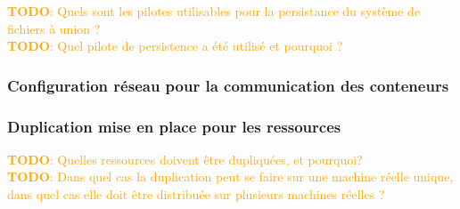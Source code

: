 \documentclass[a11paper, 11pt]{article}
\newcommand{\todo}[1]{\textcolor{orange}{\textbf{TODO}: #1}}
\begin{document}
\todo{Quels sont les pilotes utilisables pour la persistance du système de fichiers
à union ?} \\
\todo{Quel pilote de persistence a été utilisé et pourquoi ?}

\subsubsection{Configuration réseau pour la communication des conteneurs}

\subsubsection{Duplication mise en place pour les ressources}

\todo{Quelles ressources doivent être dupliquées, et pourquoi?} \\
\todo{Dans quel cas la duplication peut se faire sur une machine réelle unique, dans
quel cas elle doit être distribuée sur plusieurs machines réelles ?}


\end{document}

